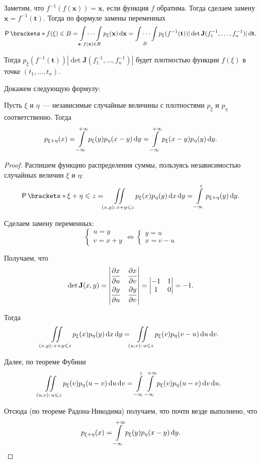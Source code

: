 Заметим, что \(f^{-1}(f(\mathbf{x})) = \mathbf{x}\), если функция \(f\) 
обратима. Тогда сделаем замену \(\mathbf{x} = f^{-1}(\mathbf{t})\). Тогда по 
формуле замены переменных
\[
\Pr{f(\xi) \in B} = \idotsint\limits_{\mathbf{x}:\,f(\mathbf{x}) \in B} 
p_{\xi}(\mathbf{x}) \diff\mathbf{x} = \idotsint\limits_{B} 
p_{\xi}(f^{-1}(\mathbf{t}))|\det \mathbf{J}(f^{-1}_1, \dots, f^{-1}_n)| 
\diff\mathbf{t}.
\]

Тогда \(p_{\xi}(f^{-1}(\mathbf{t}))|\det \mathbf{J}(f^{-1}_1, \dots, 
f^{-1}_n)|\) будет плотностью функции \(f(\xi)\) в точке \((t_1, \dots, t_n)\).

Докажем следующую формулу:
\begin{theorem}
	Пусть \(\xi\) и \(\eta\)~--- независимые случайные величины с плотностями 
	\(p_{\xi}\) и \(p_{\eta}\) соответственно. Тогда
	\[
	p_{\xi + \eta}(x) = \int\limits_{-\infty}^{+\infty} p_{\xi}(y)p_{\eta}(x - 
	y)\mathop{}\!\mathrm{d} y = \int\limits_{-\infty}^{+\infty} p_{\xi}(x - y)p_{\eta}(y)\mathop{}\!\mathrm{d} 
	y.
	\]
\end{theorem}
\begin{proof}
	Распишем функцию распределения суммы, пользуясь независимостью случайных 
	величин \(\xi\) и \(\eta\): 
	\[
	\Pr{\xi + \eta \leq z} = \iint\limits_{(x, y):\,x + y \leq z} 
	p_{\xi}(x)p_{\eta}(y)\diff x \diff y = \int\limits_{-\infty}^{z} p_{\xi + 
	\eta}(y)\diff y.
	\]
	
	Сделаем замену переменных:
	\[
	\begin{cases}
	u = y \\
	v = x + y
	\end{cases}
	\iff
	\begin{cases}
	y = u \\
	x = v - u
	\end{cases}
	\]
	
	Получаем, что 
	\[
	\det \mathbf{J}(x, y) = 
	\begin{vmatrix}
	\dfrac{\strut\partial x}{\strut\partial u} & \dfrac{\strut\partial 
	x}{\strut\partial v} \\
	\dfrac{\strut\partial y}{\strut\partial u} & \dfrac{\strut\partial 
	y}{\strut\partial v}
	\end{vmatrix} =
	\begin{vmatrix}
	-1 & 1 \\
	1 & 0
	\end{vmatrix}
	= -1.
	\]
	
	Тогда
	\[
	\iint\limits_{(x, y):\,x + y \leqslant z} p_{\xi}(x)p_{\eta}(y)\mathop{}\!\mathrm{d} x \mathop{}\!\mathrm{d} y = 
	\iint\limits_{(u, v):\,u \leqslant z} p_{\xi}(v)p_{\eta}(v - u)\mathop{}\!\mathrm{d} u \mathop{}\!\mathrm{d} v.
	\]
	
	Далее, по теореме Фубини
	\[
	\iint\limits_{(u, v):\,u \leqslant z} p_{\xi}(v)p_{\eta}(u - v)\mathop{}\!\mathrm{d} u \mathop{}\!\mathrm{d} v = 
	\int\limits_{-\infty}^{z}\int\limits_{-\infty}^{+\infty} 
	p_{\xi}(v)p_{\eta}(u - v)\mathop{}\!\mathrm{d} v \mathop{}\!\mathrm{d} u.
	\]
	
	Отсюда (по теореме Радона-Никодима) получаем, что почти везде выполнено, что
	\[
	p_{\xi + \eta}(x) = \int\limits_{-\infty}^{+\infty} p_{\xi}(y)p_{\eta}(x - 
	y)\mathop{}\!\mathrm{d} y.\qedhere
	\]
\end{proof}

